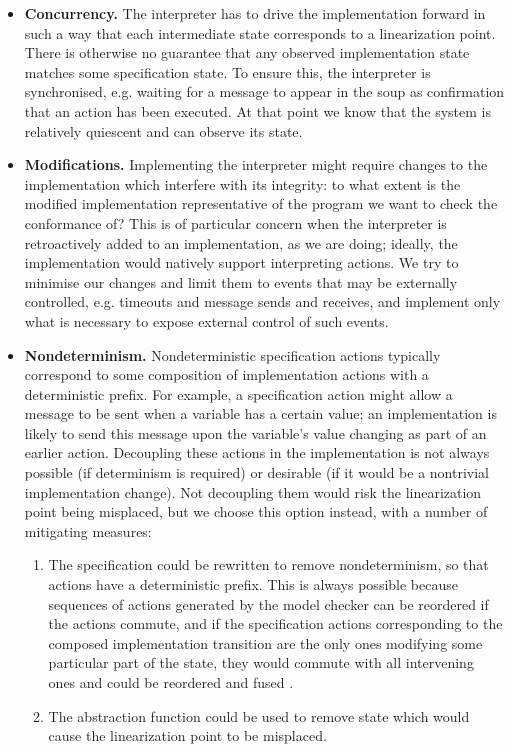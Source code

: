 \documentclass[a4paper]{article}
\begin{document}
\begin{itemize}
\item \textbf{Concurrency.} The interpreter has to drive the implementation forward in such a way that each intermediate state corresponds to a linearization point.
%
There is otherwise no guarantee that any observed implementation state matches some specification state.
%
To ensure this, the interpreter is synchronised, e.g. waiting for a message to appear in the soup as confirmation that an action has been executed.
%
At that point we know that the system is relatively quiescent and can observe its state.

\item \textbf{Modifications.} Implementing the interpreter might require changes to the implementation which interfere with its integrity: to what extent is the modified implementation representative of the program we want to check the conformance of?
%
This is of particular concern when the interpreter is retroactively added to an implementation, as we are doing; ideally, the implementation would natively support interpreting actions.
%
We try to minimise our changes and limit them to events that may be externally controlled, e.g. timeouts and message sends and receives, and implement only what is necessary to expose external control of such events.


\item \textbf{Nondeterminism.} Nondeterministic specification actions typically correspond to some composition of implementation actions with a deterministic prefix.
%
For example, a specification action might allow a message to be sent when a variable has a certain value; an implementation is likely to send this message upon the variable's value changing as part of an earlier action.
%
Decoupling these actions in the implementation is not always possible (if determinism is required) or desirable (if it would be a nontrivial implementation change).
%
Not decoupling them would risk the linearization point being misplaced, but we choose this option instead, with a number of mitigating measures:

\begin{enumerate}
\item The specification could be rewritten to remove nondeterminism, so that actions have a deterministic prefix.
%
This is always possible because sequences of actions generated by the model checker can be reordered if the actions commute, and if the specification actions corresponding to the composed implementation transition are the only ones modifying some particular part of the state, they would commute with all intervening ones and could be reordered and fused \cite{lipton1975reduction}.

\item The abstraction function could be used to remove state which would cause the linearization point to be misplaced.
\end{enumerate}

\end{itemize}
\end{document}

